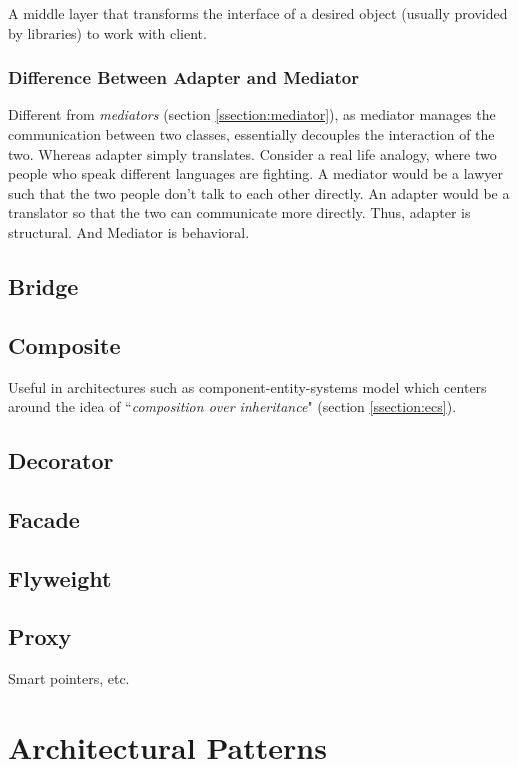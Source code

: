 \documentclass[10pt,letterpaper]{article}
\newcommand{\bs}{\bigskip}
\begin{document}
\begin{multicols}{2}
A middle layer that transforms the interface of a desired object (usually provided by libraries) to work with client.

\subsubsection{Difference Between Adapter and Mediator}

Different from \textit{mediators} (section \ref{ssection:mediator}), as mediator manages the communication between two classes, essentially decouples the interaction of the two. Whereas adapter simply translates.
\bs
Consider a real life analogy, where two people who speak different languages are fighting. A mediator would be a lawyer such that the two people don't talk to each other directly. An adapter would be a translator so that the two can communicate more directly.
\bs
Thus, adapter is structural. And Mediator is behavioral.

\subsection{Bridge}

\subsection{Composite}
Useful in architectures such as component-entity-systems model which centers around the idea of ``\textit{composition over inheritance}" (section \ref{ssection:ecs}).


\subsection{Decorator}

\subsection{Facade}

\subsection{Flyweight}

\subsection{Proxy}

Smart pointers, etc.

\section{Architectural Patterns}


\end{multicols}
\end{document}
